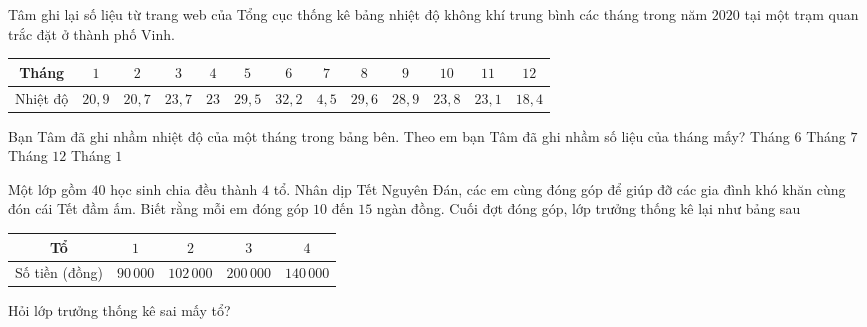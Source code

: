 

\begin{ex}%
	Tâm ghi lại số liệu từ trang web của Tổng cục thống kê  bảng nhiệt độ không khí trung bình các tháng trong năm $2020$ tại một trạm quan trắc đặt ở thành phố Vinh.
	\begin{longtable}{|c|c|c|c|c|c|c|c|c|c|c|c|c|}
		\hline 
		Tháng&$1$&$2$&$3$&$4$&$5$&$6$&$7$&$8$&$9$&$10$&$11$&$12$\\ 
		\hline 
		Nhiệt  độ&$20{,}9$&$20{,}7$&$23{,}7$&$23$&$29{,}5$&$32{,}2$&$4{,}5$&$29{,}6$&$28{,}9$&$23{,}8$&$23{,}1$&$18{,}4$\\
		 \hline
	\end{longtable}\noindent
	Bạn Tâm đã ghi nhầm  nhiệt độ của một tháng trong bảng bên. Theo em bạn Tâm đã ghi nhầm số liệu của tháng mấy?
	\choice 
		 {Tháng $6$}
		{\True Tháng $7$} 
		{Tháng  $12$}
		{Tháng  $1$}
\end{ex}





\begin{bt}%
	 Một lớp gồm $40$ học sinh chia đều thành $4$ tổ. Nhân dịp Tết Nguyên Đán, các em cùng đóng góp để giúp đỡ các gia đình khó khăn cùng đón cái Tết đầm ấm. Biết rằng mỗi em đóng góp $10$ đến $15$ ngàn đồng. Cuối đợt đóng góp, lớp trưởng thống kê lại như bảng sau
	\begin{center}
		\begin{tabular}{|c|c|c|c|c|}
			\hline Tổ& $1$ & $2$ &  $3$ & $4$ \\
			\hline Số tiền (đồng) & $90\,000$ & $102\,000$ & $200\,000$ & $140\,000$ \\ 
			 \hline
		\end{tabular}
	\end{center}
	Hỏi  lớp trưởng thống kê sai mấy tổ?
\end{bt}



